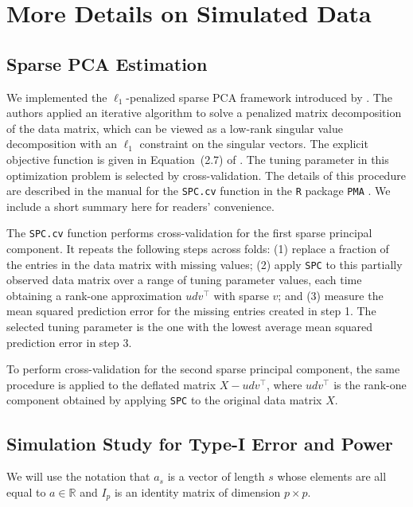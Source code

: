 \documentclass[11pt]{article}
\newenvironment{revblock}
  {\color{teal}}
  {}
\begin{document}
\section{More Details on Simulated Data}

\subsection{Sparse PCA Estimation}\label{app: sPCA}

\begin{revblock}
We implemented the $\ell_1$-penalized sparse PCA framework introduced by \cite{witten2009penalized}. The authors applied an iterative algorithm to solve a penalized matrix decomposition of the data matrix, which can be viewed as a low-rank singular value decomposition with an $\ell_1$ constraint on the singular vectors. The explicit objective function is given in Equation~(2.7) of \cite{witten2009penalized}. The tuning parameter in this optimization problem is selected by cross-validation. The details of this procedure are described in the manual for the \texttt{SPC.cv} function in the \texttt{R} package \texttt{PMA} \citep{PMA}. We include a short summary here for readers' convenience.

The \texttt{SPC.cv} function performs cross-validation for the first sparse principal component. It repeats the following steps across folds: (1) replace a fraction of the entries in the data matrix with missing values; (2) apply \texttt{SPC} to this partially observed data matrix over a range of tuning parameter values, each time obtaining a rank-one approximation $udv^\top$ with sparse $v$; and (3) measure the mean squared prediction error for the missing entries created in step 1. The selected tuning parameter is the one with the lowest average mean squared prediction error in step 3.

To perform cross-validation for the second sparse principal component, the same procedure is applied to the deflated matrix $X-udv^\top$, where $udv^\top$ is the rank-one component obtained by applying \texttt{SPC} to the original data matrix $X$.
\end{revblock}


\subsection{Simulation Study for Type-I Error and Power}\label{app: simulated data}
We will use the notation that $a_s$ is a vector of length $s$ whose elements are all equal to $a\in\mathbb{R}$ and $I_p$ is an identity matrix of dimension $p\times p$.
\end{document}

